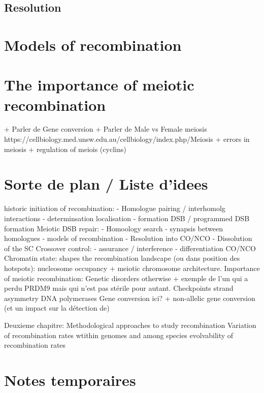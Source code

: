 \subsection{Resolution}

\section{Models of recombination}

\section{The importance of meiotic recombination}


+ Parler de Gene conversion
+ Parler de Male vs Female meiosis  https://cellbiology.med.unsw.edu.au/cellbiology/index.php/Meiosis
+ errors in meiosis
+ regulation of meiois (cyclins)






\section*{Sorte de plan / Liste d'idees}
historic
initiation of recombination: 
- Homologue pairing / interhomolg interactions
- determinsation localisation
- formation DSB / programmed DSB formation
Meiotic DSB repair:
- Homoology search
- synapsis between homologues
- models of recombination
- Resolution into CO/NCO
- Dissolution of the SC
Crossover control: 
- assurance / interference
- differentiation CO/NCO
Chromatin state: shapes the recombination landscape (ou dans position des hotspots): nucleosome occupancy + meiotic chromosome architecture. 
Importance of meiotic recombination: Genetic disorders otherwise + exemple de l'un qui a perdu PRDM9 mais qui n'est pas stérile pour autant. 
Checkpoints
strand asymmetry
DNA polymerases
Gene conversion ici? + non-allelic gene conversion (et un impact sur la détection de)



Deuxieme chapitre:
Methodological approaches to study recombination
Variation of recombination rates wtithin genomes and among species
evolvability of recombination rates



\section*{Notes temporaires}


